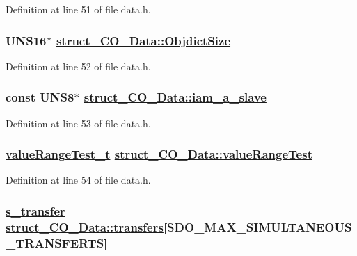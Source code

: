 Definition at line 51 of file data.h.\hypertarget{structstruct__CO__Data_6c3f14328d7662f0adc1da9964327a2e}{
\subsubsection[ObjdictSize]{\setlength{\rightskip}{0pt plus 5cm}UNS16$\ast$ \hyperlink{structstruct__CO__Data_6c3f14328d7662f0adc1da9964327a2e}{struct\_\-CO\_\-Data::Objdict\-Size}}}
\label{structstruct__CO__Data_6c3f14328d7662f0adc1da9964327a2e}




Definition at line 52 of file data.h.\hypertarget{structstruct__CO__Data_cfe2baf2887f190ca8deebaf462e62fe}{
\subsubsection[iam\_\-a\_\-slave]{\setlength{\rightskip}{0pt plus 5cm}const UNS8$\ast$ \hyperlink{structstruct__CO__Data_cfe2baf2887f190ca8deebaf462e62fe}{struct\_\-CO\_\-Data::iam\_\-a\_\-slave}}}
\label{structstruct__CO__Data_cfe2baf2887f190ca8deebaf462e62fe}




Definition at line 53 of file data.h.\hypertarget{structstruct__CO__Data_a8e71f9e9e67d0a594bad7dbbe99a35a}{
\subsubsection[valueRangeTest]{\setlength{\rightskip}{0pt plus 5cm}\hyperlink{objacces_8h_270e94e9acf61da8b2f36b3ebdbf2fdd}{value\-Range\-Test\_\-t} \hyperlink{structstruct__CO__Data_a8e71f9e9e67d0a594bad7dbbe99a35a}{struct\_\-CO\_\-Data::value\-Range\-Test}}}
\label{structstruct__CO__Data_a8e71f9e9e67d0a594bad7dbbe99a35a}




Definition at line 54 of file data.h.\hypertarget{structstruct__CO__Data_a7fda2c6f5815323c3d79efb4641c465}{
\subsubsection[transfers]{\setlength{\rightskip}{0pt plus 5cm}\hyperlink{structstruct__s__transfer}{s\_\-transfer} \hyperlink{structstruct__CO__Data_a7fda2c6f5815323c3d79efb4641c465}{struct\_\-CO\_\-Data::transfers}\mbox{[}SDO\_\-MAX\_\-SIMULTANEOUS\_\-TRANSFERTS\mbox{]}}}
\label{structstruct__CO__Data_a7fda2c6f5815323c3d79efb4641c465}





